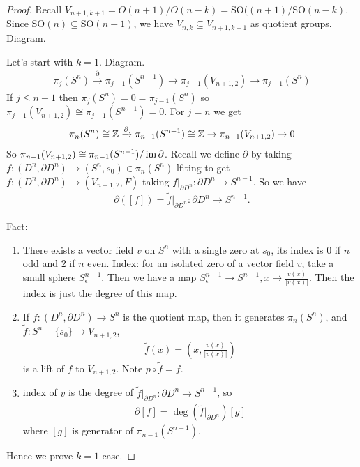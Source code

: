 \documentclass[12pt,class=article,crop=false]{standalone}
\begin{document}
\begin{proof}
Recall $ V_{n+1,k+1} = O(n+1) / O(n-k) = \text{SO}((n+1) / \text{SO}(n-k)  $. Since $ \text{SO}( n) \subseteq \text{SO}(n+1) $, we have $ V_{n,k} \subseteq V_{n+1,k+1}$ as quotient groups. Diagram.

Let's start with $ k=1$. Diagram.
 \begin{align*}
	\pi_j(S^{n}) \xrightarrow{ \partial } \pi_{j-1} (S^{n-1}) \to \pi_{j-1} (V_{n+1,2}) \to \pi_{j-1}(S^{n})
\end{align*}
If $ j \leq n-1$ then  $ \pi_j(S^{n}) =0 = \pi_{j-1}(S^{n})$ so $ \pi_{j-1}(V_{n+1,2}) \cong \pi_{j-1}(S^{n-1}) = 0$. For $ j=n$ we get
 \begin{align*}
	\pi_n(S^{n}) \cong \mathbb{Z} \xrightarrow{ \partial } \pi_{n-1} (S^{n-1}) \cong \mathbb{Z} \to \pi_{n-1}(V_{n+1,2}) \to 0
\end{align*}
So $ \pi_{n-1}(V_{n+1,2}) \cong \pi_{n-1}(S^{n-1}) / \operatorname{im} \partial $. Recall we define  $ \partial $ by taking $ f:(D^{n}, \partial D^{n}) \to (S^{n},s_0) \in \pi_n(S^{n})$ lfiting to get $ \widetilde{ f}: (D^{n}, \partial D^{n}) \to (V_{n+1,2},F)$ taking $ \widetilde{ f}|_{\partial D^{n}}: \partial D^{n} \to S^{n-1}$. So we have
\begin{align*}
	\partial ([f]) = \widetilde{ f} |_{ \partial D^{n}}: \partial D^{n} \to S^{n-1}.
\end{align*}

Fact:
\begin{enumerate}[label=(\arabic*)]
	\item There exists a vector field $ v$ on  $ S^{n}$ with a single zero at $ s_0$, its index is 0 if $ n$ odd and  $ 2$ if  $ n$ even. Index: for an isolated zero of a vector field $ v$, take a small sphere  $ S_{ \epsilon}^{n-1}$. Then we have a map $ S_{ \epsilon}^{n-1} \to S^{n-1}, x\mapsto \frac{v(x)}{ |v(x)|}$. Then the index is just the degree of this map.
	\item If  $ f:(D^{n},\partial D^{n}) \to S^{n}$ is the quotient map, then it generates $ \pi_n(S^{n})$, and $ \widetilde{ f}: S^{n} - \{s_0\} \to V_{n+1,2} $,
		\begin{align*}
			\widetilde{ f}(x) = \left( x, \frac{v(x)}{ |v(x)|} \right) 
		\end{align*}
		is a lift of $ f $ to $ V_{n+1,2}$. Note $ p \circ \widetilde{ f} = f$.
	\item index of $ v$ is the degree of  $ \widetilde{ f}|_{ \partial D^{n}}: \partial D^{n} \to S^{n-1}$, so
		\begin{align*}
			\partial [f] = \deg (\widetilde{ f}|_{ \partial D^{n}}) [g]
		\end{align*}
		where $ [g]$ is generator of  $ \pi_{n-1}(S^{n-1})$.
\end{enumerate}
Hence we prove $ k=1$ case.


\end{proof}
\end{document}
